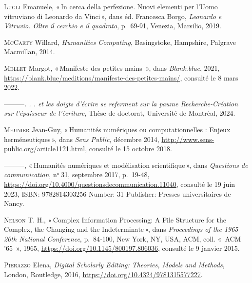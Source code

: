 \begin{CSLReferences}{1}{0}
\leavevmode{}%
\textsc{Lugli} Emanuele, {«\,In cerca della perfezione. {Nuovi} elementi
per l'{Uomo} vitruviano di {Leonardo} da {Vinci}\,»}, dans éd. Francesca
Borgo, \emph{Leonardo e {Vitruvio}. {Oltre} il cerchio e il quadrato},
p.~69‑91, Venezia, Marsilio, 2019.

\leavevmode{}%
\textsc{McCarty} Willard, \emph{Humanities {Computing}}, Basingstoke,
Hampshire, Palgrave Macmillan, 2014.

\leavevmode{}%
\textsc{Mellet} Margot, {«\,Manifeste des petites mains {\textbar}\,»},
dans \emph{Blank.blue}, 2021,
\url{https://blank.blue/meditions/manifeste-des-petites-mains/},
consulté le 8 mars 2022.

\leavevmode{}%
---------\emph{. . . et les doigts d'écrire se referment sur la paume
{Recherche}-{Création} sur l'épaisseur de l'écriture}, Thèse de
doctorat, Université de Montréal, 2024.

\leavevmode{}%
\textsc{Meunier} Jean-Guy, {«\,Humanités numériques ou computationnelles
: {Enjeux} herméneutiques\,»}, dans \emph{Sens Public}, décembre 2014,
\url{http://www.sens-public.org/article1121.html}, consulté le 15
octobre 2018.

\leavevmode{}%
---------, {«\,Humanités numériques et modélisation scientifique\,»},
dans \emph{Questions de communication}, nᵒ 31, septembre 2017, p.~19‑48,
\url{https://doi.org/10.4000/questionsdecommunication.11040}, consulté
le 19 juin 2023, ISBN: 9782814303256 Number: 31 Publisher: Presses
universitaires de Nancy.

\leavevmode{}%
\textsc{Nelson} T. H., {«\,Complex {Information} {Processing}: {A}
{File} {Structure} for the {Complex}, the {Changing} and the
{Indeterminate}\,»}, dans \emph{Proceedings of the 1965 20th {National}
{Conference}}, p.~84‑100, New York, NY, USA, ACM, coll. «~{ACM} '65~»,
1965, \url{https://doi.org/10.1145/800197.806036}, consulté le 9 janvier
2015.

\leavevmode{}%
\textsc{Pierazzo} Elena, \emph{Digital {Scholarly} {Editing}:
{Theories}, {Models} and {Methods}}, London, Routledge, 2016,
\url{https://doi.org/10.4324/9781315577227}.


\end{CSLReferences}
